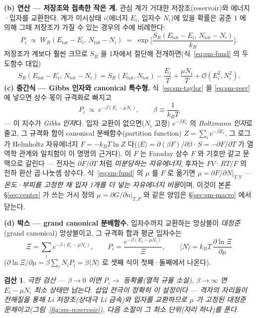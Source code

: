\documentclass[11pt,a4paper]{article}
\newtheorem*{verifybox}{검산}
\begin{document}
\textbf{(b) 연산 --- 저장조와 접촉한 작은 계.} 관심 계가 거대한 저장조(reservoir)와 에너지·입자를 교환한다.
계가 미시상태 $i$(에너지 $E_i$, 입자수 $N_i$)에 있을 확률은 공준 1 에 의해 그때 저장조가 가질 수 있는 경우의
수에 비례한다:
\begin{equation}
P_i\;\propto\;W_R(E_\mathrm{tot}-E_i,\,N_\mathrm{tot}-N_i)
\;=\;\exp\!\Big[\frac{S_R(E_\mathrm{tot}-E_i,\,N_\mathrm{tot}-N_i)}{k_B}\Big].
\label{eq:sm-resv}
\end{equation}
저장조가 계보다 훨씬 크므로 $S_R$ 을 1차에서 절단해 전개하면(식~\eqref{eq:sm-fund} 의 두 도함수 대입)
\begin{equation}
S_R(E_\mathrm{tot}-E_i,\,N_\mathrm{tot}-N_i)
= S_R(E_\mathrm{tot},N_\mathrm{tot})-\frac{E_i}{T}+\frac{\mu N_i}{T}+\mathcal O(E_i^2,N_i^2).
\label{eq:sm-taylor}
\end{equation}
\textbf{(c) 중간식 --- Gibbs 인자와 canonical 특수형.} 식~\eqref{eq:sm-taylor} 을 \eqref{eq:sm-resv} 에 넣으면
상수 몫이 규격화로 빠지고
\begin{equation}
P_i\;\propto\;e^{-\beta(E_i-\mu N_i)},\qquad \beta\equiv\frac{1}{k_BT}
\label{eq:sm-gibbsfactor}
\end{equation}
--- 이 지수가 \emph{Gibbs 인자}다. 입자 교환이 없으면($N_i$ 고정) $e^{-\beta E_i}$ 의 \emph{Boltzmann 인자}로
줄고, 그 규격화 합이 canonical 분배함수(partition function) $Z=\sum_ie^{-\beta E_i}$, 그 로그가 Helmholtz
자유에너지 $F=-k_BT\ln Z$ 다($\langle E\rangle=\partial(\beta F)/\partial\beta$·$S=-\partial F/\partial T$ 가
열역학 관계와 일치함이 이 명명의 근거다). 이 $F$ 는 Faraday 상수 $F$ 와 기호만 같고 문맥으로 갈린다 —
전자는 $\partial F/\partial T$ 처럼 \emph{미분당하는 자유에너지}, 후자는 $FV$·$RT/F$ 의 전하 환산
곱$\cdot$나눗셈 상수다. 식~\eqref{eq:sm-fund} 의 $\mu$ 를 $F$ 로 옮기면
$\mu=\partial F/\partial N|_{T,V}$ --- \emph{온도·부피를 고정한 채 입자 1개를 더 넣는 자유에너지 비용}이며,
이것이 본론 \S\ref{sec:center} 가 쓰는 거시 정의 $\mu=\partial G/\partial n|_{T,P}$ 와 같은 양임은
\S\ref{sec:sm-macro} 에서 닫는다.

\textbf{(d) 박스 --- grand canonical 분배함수.} 입자수까지 교환하는 앙상블이
\emph{대정준}(grand canonical) 앙상블이고, 그 규격화 합과 평균 입자수는
\begin{equation}
\boxed{\;\Xi=\sum_i e^{-\beta(E_i-\mu N_i)},\qquad
P_i=\frac{e^{-\beta(E_i-\mu N_i)}}{\Xi},\qquad
\langle N\rangle=k_BT\,\frac{\partial\ln\Xi}{\partial\mu}\;}
\label{eq:sm-gc}
\end{equation}
($\partial\ln\Xi/\partial\mu=\beta\sum_iN_iP_i=\beta\langle N\rangle$ 로 셋째 식이 첫째·둘째에서 나온다).
\begin{verifybox}
극한 검산 --- $\beta\to0$ 이면 $P_i\to$ 등확률(열적 규율 소실), $\beta\to\infty$ 면 $E_i-\mu N_i$ 최소 상태만
남는다. 삽입 전극이 정확히 이 설정이다 --- 격자의 자리들이 전해질을 통해 Li 저장조(상대극 Li 금속)와 입자를
교환하므로 $\mu$ 가 고정된 대정준 문제이고(그림~\ref{fig:sm-reservoir}), 다음 소절이 그 최소 단위(자리
하나)를 푼다.
\end{verifybox}
\end{document}
